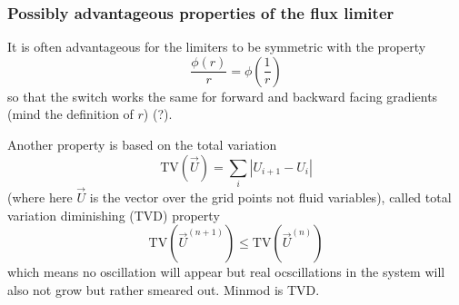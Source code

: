 
\subsubsection{Possibly advantageous properties of the flux limiter}
It is often advantageous for the limiters to be symmetric with the property
\begin{equation}
    \frac{\phi(r)}{r} = \phi \left( \frac{1}{r} \right)
\end{equation}
so that the switch works the same for forward and backward facing
gradients (mind the definition of $r$) (?).

Another property is based on the total variation
\begin{equation}
    \text{TV}(\vec{U}) = \sum_i \left| U_{i+1} - U_i \right|
\end{equation}
(where here $\vec{U}$ is the vector over the grid points not fluid variables),
called total variation diminishing (TVD) property
\begin{equation}
    \text{TV}(\vec{U}^{(n+1)}) \leq \text{TV}(\vec{U}^{(n)})
\end{equation}
which means no oscillation will appear but real ocscillations
in the system will also not grow but rather smeared out.
Minmod is TVD.

\pagebreak